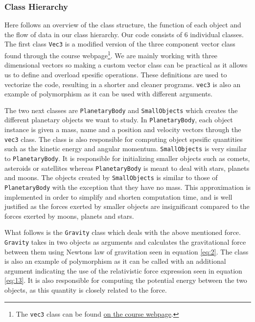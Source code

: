 \documentclass[a4paper, 10pt, reqno]{amsart}
\begin{document}
\subsubsection{Class Hierarchy} Here follows an overview of the class structure, the function of each object and the flow of data in our class hierarchy. Our code consists of 6 individual classes. The first class \texttt{Vec3} is a modified version of the three component vector class found through the course webpage\footnote{The \texttt{vec3} class can be found \href{https://github.com/CompPhysics/ComputationalPhysics/tree/master/doc/Programs/OOExamples/VectorClass}{\color{blue}on the course webpage}.}. We are mainly working with three dimensional vectors so making a custom vector class can be practical as it allows us to define and overload spesific operations. These definitions are used to vectorize the code, resulting in a shorter and cleaner programs. \texttt{vec3} is also an example of polymorphism as it can be used with different arguments.

The two next classes are \texttt{PlanetaryBody} and \texttt{SmallObjects} which creates the different planetary objects we want to study. In \texttt{PlanetaryBody}, each object instance is given a mass, name and a position and velocity vectors through the \texttt{vec3} class. The class is also responsible for computing object spesific quantities such as the kinetic energy and angular momentum. \texttt{SmallObjects} is very similar to \texttt{PlanetaryBody}. It is responsible for initializing smaller objects such as comets, asteroids or satellites whereas \texttt{PlanetaryBody} is meant to deal with stars, planets and moons. The objects created by \texttt{SmallObjects} is similar to those of \texttt{PlanetaryBody} with the exception that they have no mass. This approximation is implemented in order to simplify and shorten computation time, and is well justified as the forces exerted by smaller objects are insignificant compared to the forces exerted by moons, planets and stars.

What follows is the \texttt{Gravity} class which deals with the above mentioned force. \texttt{Gravity} takes in two objects as arguments and calculates the gravitational force between them using Newtons law of gravitation seen in equation \eqref{eq:2}. The class is also an example of polymorphism as it can be called with an additional argument indicating the use of the relativistic force expression seen in equation \eqref{eq:13}. It is also responsible for computing the potential energy between the two objects, as this quantity is closely related to the force.
\end{document}
